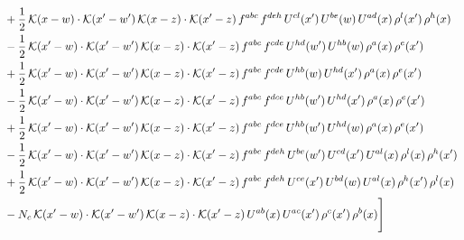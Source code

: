 \documentclass[9pt]{article}
\numberwithin{equation}{section}
\begin{document}
\begin{align}
& +\frac{1}{2}\,\mathcal{K}(x-w)\cdot\mathcal{K}(x'-w')\,\mathcal{K}(x-z)\cdot\mathcal{K}(x'-z)\,f^{abc}\,f^{deh}\,U^{cl}(x')\,U^{be}(w)\,U^{ad}(x)\,\rho^{l}(x')\,\rho^{h}(x)\notag\\
& -\frac{1}{2}\,\mathcal{K}(x'-w)\cdot\mathcal{K}(x'-w')\,\mathcal{K}(x-z)\cdot\mathcal{K}(x'-z)\,f^{abc}\,f^{cde}\,U^{hd}(w')\,U^{hb}(w)\,\rho^{a}(x)\,\rho^{e}(x')\notag\\
& +\frac{1}{2}\,\mathcal{K}(x'-w)\cdot\mathcal{K}(x'-w')\,\mathcal{K}(x-z)\cdot\mathcal{K}(x'-z)\,f^{abc}\,f^{cde}\,U^{hb}(w)\,U^{hd}(x')\,\rho^{a}(x)\,\rho^{e}(x')\notag\\
& -\frac{1}{2}\,\mathcal{K}(x'-w)\cdot\mathcal{K}(x'-w')\,\mathcal{K}(x-z)\cdot\mathcal{K}(x'-z)\,f^{abc}\,f^{dce}\,U^{hb}(w')\,U^{hd}(x')\,\rho^{a}(x)\,\rho^{e}(x')\notag\\
& +\frac{1}{2}\,\mathcal{K}(x'-w)\cdot\mathcal{K}(x'-w')\,\mathcal{K}(x-z)\cdot\mathcal{K}(x'-z)\,f^{abc}\,f^{dce}\,U^{hb}(w')\,U^{hd}(w)\,\rho^{a}(x)\,\rho^{e}(x')\notag\\
& -\frac{1}{2}\,\mathcal{K}(x'-w)\cdot\mathcal{K}(x'-w')\,\mathcal{K}(x-z)\cdot\mathcal{K}(x'-z)\,f^{abc}\,f^{deh}\,U^{be}(w')\,U^{cd}(x')\,U^{al}(x)\,\rho^{l}(x)\,\rho^{h}(x')\notag\\
& +\frac{1}{2}\,\mathcal{K}(x'-w)\cdot\mathcal{K}(x'-w')\,\mathcal{K}(x-z)\cdot\mathcal{K}(x'-z)\,f^{abc}\,f^{deh}\,U^{ce}(x')\,U^{bd}(w)\,U^{al}(x)\,\rho^{h}(x')\,\rho^{l}(x)\notag\\
& -N_{c}\,\mathcal{K}(x'-w)\cdot\mathcal{K}(x'-w')\,\mathcal{K}(x-z)\cdot\mathcal{K}(x'-z)\,U^{ab}(x)\,U^{ac}(x')\,\rho^{c}(x')\,\rho^{b}(x)\Bigg]
\end{align}
\end{document}
